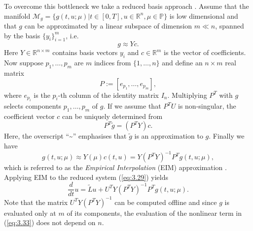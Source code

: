 To overcome this bottleneck we take a reduced basis approach \cite{doi:10.1137/090766498,barrault2004empirical}. Assume that the manifold $\mathcal M_{g} = \{ g(t,u;\mu)| t\in [0,T], u \in \mathbb R^n , \mu \in \mathbb P\}$ is low dimensional and that $g$ can be approximated by a linear subspace of dimension $m\ll n$, spanned by the basis $\{ y_i \}_{i=1}^m$, i.e.
\begin{equation} \label{eq:3.30}
	g \approx Yc.
\end{equation}
Here $Y\in \mathbb R^{n\times m}$ contains basis vectors $y_i$ and $c\in \mathbb R^{m}$ is the vector of coefficients. Now suppose $p_1,\dots,p_m$ are $m$ indices from $\{1,\dots,n\}$ and define an $n\times m$ real matrix
\begin{equation} \label{eq:MoOr:11}
P := [e_{p_1},\dots,e_{p_m}],
\end{equation}
where $e_{p_i}$ is the $p_i$-th column of the identity matrix $I_n$. Multiplying $P^T$ with $g$ selects components $p_1,\dots,p_m$ of $g$. If we assume that $P^TU$ is non-singular, the coefficient vector $c$ can be uniquely determined from
\begin{equation} \label{eq:3.31}
	P^T \tilde g = (P^T Y) c.
\end{equation}
Here, the overscript ``\textasciitilde'' emphasises that $\tilde g$ is an approximation to $g$. Finally we have 
\begin{equation} \label{eq:3.32}
	g(t,u;\mu) \approx Y(\mu) c(t,u) = Y (P^TY)^{-1} P^T g(t,u;\mu),
\end{equation}
which is referred to as the \emph{Empirical Interpolation} (EIM) approximation \cite{barrault2004empirical}. Applying EIM to the reduced system (\ref{eq:3.29}) yields
\begin{equation} \label{eq:3.33}
	\frac{d}{dt} u = \tilde L u + U^T Y (P^TY)^{-1} P^T g(t,u;\mu).
\end{equation}
Note that the matrix $U^T Y (P^TY)^{-1}$ can be computed offline and since $g$ is evaluated only at $m$ of its components, the evaluation of the nonlinear term in (\ref{eq:3.33}) does not depend on $n$.

